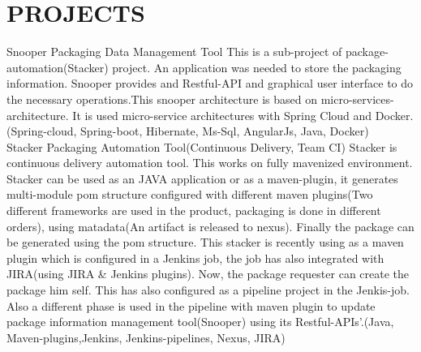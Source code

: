 \documentclass[]{cv-class}
\begin{document}
\section{PROJECTS}
\begin{entrylist}
\entry
    {}
	{Snooper}    
    {Packaging Data Management Tool}
{This is a sub-project of package-automation(Stacker) project. An application was needed to store the packaging information. Snooper provides and Restful-API and graphical user interface to do the necessary operations.This snooper architecture is based on micro-services-architecture. It is used micro-service architectures with Spring Cloud and Docker.(Spring-cloud, Spring-boot, Hibernate, Ms-Sql, AngularJs, Java, Docker)}
\\
\entry
    {}
	{Stacker}    
    {Packaging Automation Tool(Continuous Delivery, Team CI)}
    {Stacker is continuous delivery automation tool. This works on fully mavenized environment. Stacker can be used as an JAVA application or as a maven-plugin, it generates multi-module pom structure configured with different maven plugins(Two 			different frameworks are used in the product, packaging is done in different orders), using matadata(An artifact is released to nexus). Finally the package can be generated using the pom structure. This stacker is recently using as a maven plugin which is configured in a Jenkins job, the job has also integrated with JIRA(using JIRA \& Jenkins plugins). Now, the package requester 		can create the package him self. This has also configured as a pipeline project in the Jenkis-job. Also a different phase is used in the pipeline with maven plugin to update package information management tool(Snooper) using its Restful-APIs'.(Java, Maven-plugins,Jenkins, Jenkins-pipelines, Nexus, JIRA)}

\end{entrylist}


\newpage
\begin{aside}
\end{aside}
\end{document}
